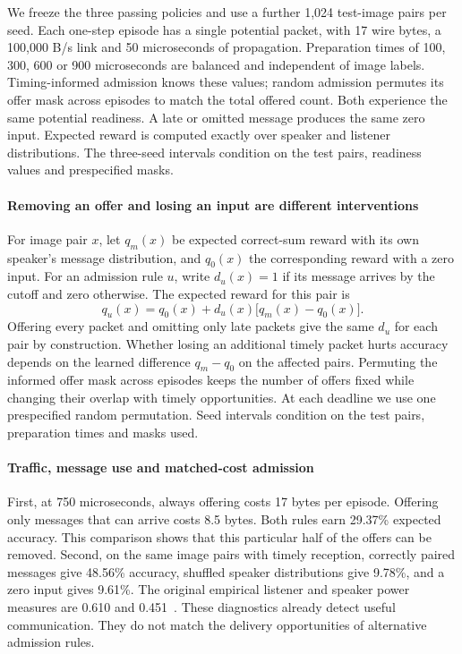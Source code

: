 \documentclass[a4paper,fleqn]{cas-dc}
\begin{document}
We freeze the three passing policies and use a further 1,024 test-image pairs per seed. Each one-step episode has a single potential packet, with 17 wire bytes, a 100,000 B/s link and 50 microseconds of propagation. Preparation times of 100, 300, 600 or 900 microseconds are balanced and independent of image labels. Timing-informed admission knows these values; random admission permutes its offer mask across episodes to match the total offered count. Both experience the same potential readiness. A late or omitted message produces the same zero input. Expected reward is computed exactly over speaker and listener distributions. The three-seed intervals condition on the test pairs, readiness values and prespecified masks.

\paragraph{Removing an offer and losing an input are different interventions}
For image pair $x$, let $q_m(x)$ be expected correct-sum reward with its own speaker's message distribution, and $q_0(x)$ the corresponding reward with a zero input. For an admission rule $u$, write $d_u(x)=1$ if its message arrives by the cutoff and zero otherwise. The expected reward for this pair is
\begin{equation}
 q_u(x)=q_0(x)+d_u(x)\bigl[q_m(x)-q_0(x)\bigr].
 \label{eq:mnist_delivery}
\end{equation}
Offering every packet and omitting only late packets give the same $d_u$ for each pair by construction. Whether losing an additional timely packet hurts accuracy depends on the learned difference $q_m-q_0$ on the affected pairs. Permuting the informed offer mask across episodes keeps the number of offers fixed while changing their overlap with timely opportunities. At each deadline we use one prespecified random permutation. Seed intervals condition on the test pairs, preparation times and masks used.

\paragraph{Traffic, message use and matched-cost admission}
First, at 750 microseconds, always offering costs 17 bytes per episode. Offering only messages that can arrive costs 8.5 bytes. Both rules earn 29.37\% expected accuracy. This comparison shows that this particular half of the offers can be removed. Second, on the same image pairs with timely reception, correctly paired messages give 48.56\% accuracy, shuffled speaker distributions give 9.78\%, and a zero input gives 9.61\%. The original empirical listener and speaker power measures are 0.610 and 0.451~\citep{eccles2019biases}. These diagnostics already detect useful communication. They do not match the delivery opportunities of alternative admission rules.
\end{document}
